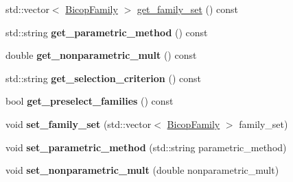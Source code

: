 \begin{DoxyCompactItemize}
\item 
std\+::vector$<$ \hyperlink{namespacevinecopulib_a42e95cc06d33896199caab0c11ad44f3}{Bicop\+Family} $>$ \hyperlink{classvinecopulib_1_1_fit_controls_bicop_a8ea096aec62cbca55641941c9b4cf8f8}{get\+\_\+family\+\_\+set} () const 
\item 
std\+::string {\bfseries get\+\_\+parametric\+\_\+method} () const \hypertarget{classvinecopulib_1_1_fit_controls_bicop_a7399d0e67b734aeca98e47a8527ffea2}{}\label{classvinecopulib_1_1_fit_controls_bicop_a7399d0e67b734aeca98e47a8527ffea2}

\item 
double {\bfseries get\+\_\+nonparametric\+\_\+mult} () const \hypertarget{classvinecopulib_1_1_fit_controls_bicop_a8358f3bf302abf5dcbc646b8ea6493bd}{}\label{classvinecopulib_1_1_fit_controls_bicop_a8358f3bf302abf5dcbc646b8ea6493bd}

\item 
std\+::string {\bfseries get\+\_\+selection\+\_\+criterion} () const \hypertarget{classvinecopulib_1_1_fit_controls_bicop_ae05604585084979bc8637aa7af881eab}{}\label{classvinecopulib_1_1_fit_controls_bicop_ae05604585084979bc8637aa7af881eab}

\item 
bool {\bfseries get\+\_\+preselect\+\_\+families} () const \hypertarget{classvinecopulib_1_1_fit_controls_bicop_a9f5a3c90dc779f4f0f694869e62e6240}{}\label{classvinecopulib_1_1_fit_controls_bicop_a9f5a3c90dc779f4f0f694869e62e6240}

\item 
void {\bfseries set\+\_\+family\+\_\+set} (std\+::vector$<$ \hyperlink{namespacevinecopulib_a42e95cc06d33896199caab0c11ad44f3}{Bicop\+Family} $>$ family\+\_\+set)\hypertarget{classvinecopulib_1_1_fit_controls_bicop_a39d4e24261da184abf3fa3dd11d1f23b}{}\label{classvinecopulib_1_1_fit_controls_bicop_a39d4e24261da184abf3fa3dd11d1f23b}

\item 
void {\bfseries set\+\_\+parametric\+\_\+method} (std\+::string parametric\+\_\+method)\hypertarget{classvinecopulib_1_1_fit_controls_bicop_a722bef09427577ba2f04c91d7e4dba90}{}\label{classvinecopulib_1_1_fit_controls_bicop_a722bef09427577ba2f04c91d7e4dba90}

\item 
void {\bfseries set\+\_\+nonparametric\+\_\+mult} (double nonparametric\+\_\+mult)\hypertarget{classvinecopulib_1_1_fit_controls_bicop_a69fa1ff241282cc5a968ff64f0029ae0}{}\label{classvinecopulib_1_1_fit_controls_bicop_a69fa1ff241282cc5a968ff64f0029ae0}


\end{DoxyCompactItemize}
